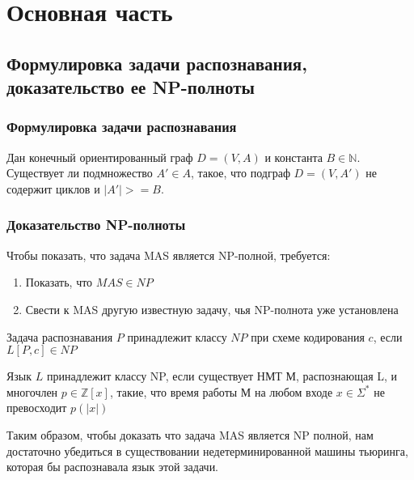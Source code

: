 
\section{Основная часть}
\subsection{Формулировка задачи распознавания, доказательство ее NP-полноты}

\subsubsection{Формулировка задачи распознавания} 

\begin{problem}
    Дан конечный ориентированный граф $D = (V, A)$ и константа 
    $B \in \mathbb{N}$. Существует ли подмножество $A' \in A$, такое, что
    подграф $D = (V, A')$ не содержит циклов и $|A'| >= B$. 
\end{problem}

\subsubsection{Доказательство NP-полноты} 

Чтобы показать, что задача MAS является NP-полной, требуется:

\begin{enumerate}
    \setlength{\itemindent}{1em}
    \item Показать, что $MAS \in NP$ \\
    \item Свести к MAS другую известную задачу, чья NP-полнота уже установлена 
\end{enumerate}

\begin{definition}
    Задача распознавания $P$ принадлежит классу $NP$ при схеме
    кодирования $c$, если $L\left[P, c\right] \in NP$
\end{definition}
\begin{definition}
    Язык $L$ принадлежит классу NP, если существует НМТ М, распознающая
    L, и многочлен $p \in \mathbb{Z}[x]$, такие, что время работы М
    на любом входе $x \in \Sigma^*$ не превосходит $p(|x|)$
\end{definition}
Таким образом, чтобы доказать что задача MAS является NP полной, нам 
достаточно убедиться в существовании недетерминированной машины 
тьюринга, которая бы распознавала язык этой задачи.

